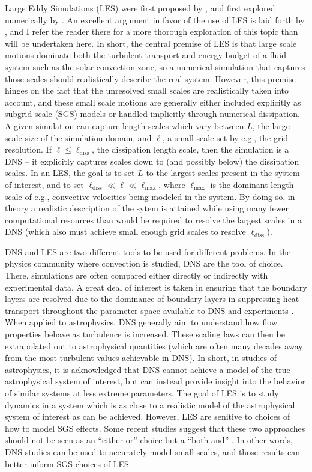 Large Eddy Simulations (LES) were first proposed by \cite{smagorinsky1963}, and first explored numerically by \citet{deardorff1970}.
An excellent argument in favor of the use of LES is laid forth by \citet{miesch&all2015}, and I refer the reader there for a more thorough exploration of this topic than will be undertaken here.
In short, the central premise of LES is that large scale motions dominate both the turbulent transport and energy budget of a fluid system such as the solar convection zone, so a numerical simulation that captures those scales should realistically describe the real system.
However, this premise hinges on the fact that the unresolved small scales are realistically taken into account, and these small scale motions are generally either included explicitly as subgrid-scale (SGS) models or handled implicitly through numerical dissipation.
A given simulation can capture length scales which vary between $L$, the large-scale size of the simulation domain, and $\ell$, a small-scale set by e.g., the grid resolution.
If $\ell \leq \ell_{\text{diss}}$, the dissipation length scale, then the simulation is a DNS -- it explicitly captures scales down to (and possibly below) the dissipation scales.
In an LES, the goal is to set $L$ to the largest scales present in the system of interest, and to set $\ell_{\text{diss}} \ll \ell \ll \ell_{\text{max}}$, where $\ell_{\text{max}}$ is the dominant length scale of e.g., convective velocities being modeled in the system.
By doing so, in theory a realistic description of the sytem is attained while using many fewer computational resources than would be required to resolve the largest scales in a DNS (which also must achieve small enough grid scales to resolve $\ell_{\text{diss}}$).

DNS and LES are two different tools to be used for different problems.
In the physics community where \RB convection is studied, DNS are the tool of choice.
There, simulations are often compared either directly or indirectly with experimental data.
A great deal of interest is taken in ensuring that the boundary layers are resolved \citep{shishkina&all2010} due to the dominance of boundary layers in suppressing heat transport throughout the parameter space available to DNS and experiments \citep{ahlers&all2009}.
When applied to astrophysics, DNS generally aim to understand how flow properties behave as turbulence is increased.
These scaling laws can then be extrapolated out to astrophysical quantities (which are often many decades away from the most turbulent values achievable in DNS).
In short, in studies of astrophysics, it is acknowledged that DNS cannot achieve a model of the true astrophysical system of interest, but can instead provide insight into the behavior of similar systems at less extreme parameters.
The goal of LES is to study dynamics in a system which is as close to a realistic model of the astrophysical system of interest as can be achieved.
However, LES are senitive to choices of how to model SGS effects.
Some recent studies suggest that these two approaches should not be seen as an ``either or'' choice but a ``both and'' \citep{mellado&all2018}.
In other words, DNS studies can be used to accurately model small scales, and those results can better inform SGS choices of LES.

